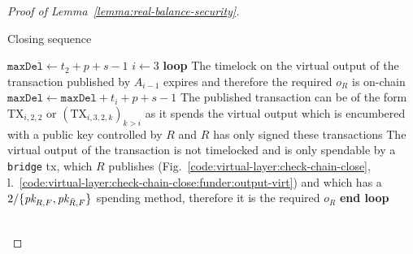 \begin{proof}[Proof of Lemma~\ref{lemma:real-balance-security}]
  \begin{center}
    \begin{notitlebox}{Closing sequence}
      \ \\
      \begin{algorithmic}[1]
        \State $\texttt{maxDel} \gets t_2 + p + s - 1$ 
        \State $i \gets 3$
        \label{code:settling-process:init-i}
        \State \textbf{loop}
        \Indent
            \State The timelock on the virtual output of the transaction
            published by $A_{i-1}$ expires and therefore the required $o_R$ is
            on-chain
          \Else \: 
            \State $\texttt{maxDel} \gets \texttt{maxDel} + t_i + p + s - 1$
            \State The published transaction can be of the form $\mathrm{TX}_{i,
            2, 2}$ or $(\mathrm{TX}_{i, 3, 2, k})_{k > i}$ as it spends the
            virtual output which is encumbered with a public key controlled by
            $R$ and $R$ has only signed these transactions
             
              \State The virtual output of the transaction is not timelocked and
              is only spendable by a \texttt{bridge} tx, which $R$ publishes
              (Fig.~\ref{code:virtual-layer:check-chain-close},
              l.~\ref{code:virtual-layer:check-chain-close:funder:output-virt})
              and which has a $2/\{\textit{pk}_{R, F}, \textit{pk}_{\bar{R}, F}\}$ spending
              method, therefore it is the required $o_R$
            \Else \: 
              \label{code:settling-process:increment}
            \EndIf
          \EndIf
        \EndIndent
        \State \textbf{end loop}
        \State {}
      \end{algorithmic}
    \end{notitlebox}
    \label{code:settling-process}
  \end{center} \ \\


\end{proof}

